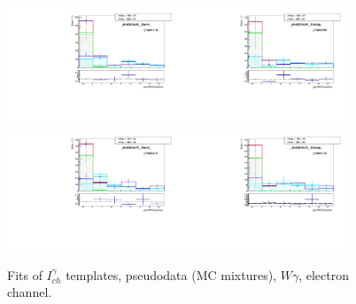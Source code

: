 \begin{figure}[htb]
\begin{center}
   \includegraphics[width=0.45\textwidth]{../figs/figs_v11/ELECTRON_WGamma/TemplateFits/c_TEMPL_CHISO_UNblind__phoEt55to65__Barrel__RooFit_MCclosure.pdf}\includegraphics[width=0.45\textwidth]{../figs/figs_v11/ELECTRON_WGamma/TemplateFits/c_TEMPL_CHISO_UNblind__phoEt55to65__Endcap__RooFit_MCclosure.pdf}\\
   \includegraphics[width=0.45\textwidth]{../figs/figs_v11/ELECTRON_WGamma/TemplateFits/c_TEMPL_CHISO_UNblind__phoEt65to75__Barrel__RooFit_MCclosure.pdf}\includegraphics[width=0.45\textwidth]{../figs/figs_v11/ELECTRON_WGamma/TemplateFits/c_TEMPL_CHISO_UNblind__phoEt65to75__Endcap__RooFit_MCclosure.pdf}\\
  \label{fig:templateFits_MCclosure_CHISO_ELECTRON_2}
  \caption{Fits of $I_{ch}^{\gamma}$ templates, pseudodata (MC mixtures), $W\gamma$, electron channel.}
  \end{center}
\end{figure}

